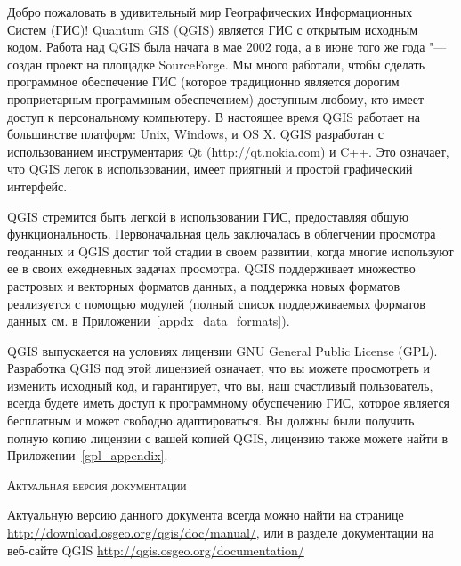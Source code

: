 \mainmatter
\pagestyle{scrheadings}
\label{label_forward}
\setcounter{page}{1}



Добро пожаловать в удивительный мир Географических Информационных Систем
(ГИС)! Quantum GIS (QGIS) является ГИС с открытым исходным кодом. Работа
над QGIS была начата в мае 2002 года, а в июне того же года "--- создан
проект на площадке SourceForge. Мы много работали, чтобы сделать
программное обеспечение ГИС (которое традиционно является дорогим
проприетарным программным обеспечением) доступным любому, кто имеет
доступ к персональному компьютеру. В настоящее время QGIS работает на
большинстве платформ: Unix, Windows, и OS X. QGIS разработан с
использованием инструментария Qt (\url{http://qt.nokia.com}) и C++.
Это означает, что QGIS легок в использовании, имеет приятный и простой
графический интерфейс.

QGIS стремится быть легкой в использовании ГИС, предоставляя общую
функциональность. Первоначальная цель заключалась в облегчении
просмотра геоданных и QGIS достиг той стадии в своем развитии, когда
многие используют ее в своих ежедневных задачах просмотра.
QGIS поддерживает множество растровых и векторных форматов данных, а
поддержка новых форматов реализуется с помощью модулей (полный список
поддерживаемых форматов данных см. в Приложении~\ref{appdx_data_formats}).

QGIS выпускается на условиях лицензии GNU General Public License (GPL).
Разработка QGIS под этой лицензией означает, что вы можете просмотреть и
изменить исходный код, и гарантирует, что вы, наш счастливый
пользователь, всегда будете иметь доступ к программному обуспечению ГИС,
которое является бесплатным и может свободно адаптироваться. Вы должны
были получить полную копию лицензии с вашей копией QGIS, лицензию также
можете найти в Приложении~\ref{gpl_appendix}.

\begin{Tip}\caption{\textsc{Актуальная версия документации}}
Актуальную версию данного документа всегда можно найти на странице
\url{http://download.osgeo.org/qgis/doc/manual/}, или в разделе
документации на веб-сайте QGIS \url{http://qgis.osgeo.org/documentation/}
\end{Tip}


